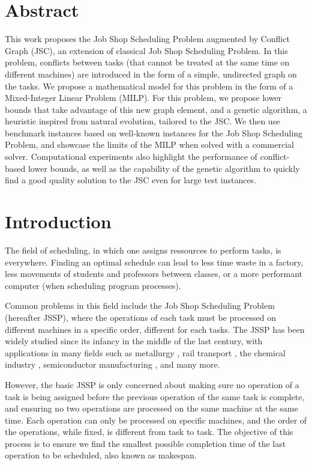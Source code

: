 \documentclass{mimosis}
\begin{document}
\chapter*{Abstract}

This work proposes the Job Shop Scheduling Problem augmented by Conflict Graph (JSC), an extension of classical Job Shop Scheduling Problem. In this problem, conflicts between tasks (that cannot be treated at the same time on different machines) are introduced in the form of a simple, undirected graph on the tasks. We propose a mathematical model for this problem in the form of a Mixed-Integer Linear Problem (MILP). For this problem, we propose lower bounds that take advantage of this new graph element, and a genetic algorithm, a heuristic inspired from natural evolution, tailored to the JSC. We then use benchmark instances based on well-known instances for the Job Shop Scheduling Problem, and showcase the limits of the MILP when solved with a commercial solver. Computational experiments also highlight the performance of conflict-based lower bounds, as well as the capability of the genetic algorithm to quickly find a good quality solution to the JSC even for large test instances.

\chapter*{Introduction}

The field of scheduling, in which one assigns ressources to perform tasks, is everywhere. Finding an optimal schedule can lead to less time waste in a factory, less movements of students and professors between classes, or a more performant computer (when scheduling program processes).

Common problems in this field include the Job Shop Scheduling Problem (hereafter JSSP), where the operations of each task must be processed on different machines in a specific order, different for each tasks. The JSSP has been widely studied since its infancy in the middle of the last century, with applications in many fields such as metallurgy \citep{yang2016pareto}, rail transport \citep{buergy2016blocking_rail_bound}, the chemical industry \citep{gao2016shuffled}, semiconductor manufacturing \citep{panwalkar2016proportionate}, and many more.

However, the basic JSSP is only concerned about making sure no operation of a task is being assigned before the previous operation of the same task is complete, and ensuring no two operations are processed on the same machine at the same time. Each operation can only be processed on specific machines, and the order of the operations, while fixed, is different from task to task. The objective of this process is to ensure we find the smallest possible completion time of the last operation to be scheduled, also known as makespan.
\end{document}
